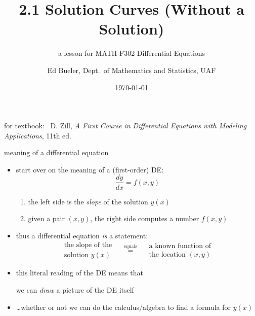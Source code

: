 \documentclass{beamer}
\title{2.1 Solution Curves (Without a Solution)}
\subtitle{a lesson for MATH F302 Differential Equations}
\author{Ed Bueler, Dept.~of Mathematics and Statistics, UAF}
\date{\tiny \today}
\begin{document}


\begin{frame}
\titlepage

\centerline{\tiny for textbook: \, D. Zill, \emph{A First Course in Differential Equations with Modeling Applications}, 11th ed.}
\end{frame}


\begin{frame}{meaning of a differential equation}

\begin{itemize}
\item start over on the meaning of a (first-order) DE:
    $$\frac{dy}{dx} = f(x,y)$$

\vspace{-2mm}
    \begin{enumerate}
    \item the left side is the \emph{slope} of the solution $y(x)$
    \item given a pair $(x,y)$, the right side computes a number $f(x,y)$
    \end{enumerate}
\item thus a differential equation \emph{is} a statement:
    $$\begin{matrix}
    \text{the slope of the} \\
    \text{solution } y(x) 
    \end{matrix} \quad \stackrel{\text{equals}}{=} \quad
    \begin{matrix}
    \text{a known function of} \\
    \text{the location } (x,y)
    \end{matrix}$$
\item this literal reading of the DE means that

\centerline{\alert{we can \emph{draw} a picture of the DE itself}}

\item \dots whether or not we can do the calculus/algebra to find a formula for $y(x)$
\end{itemize}
\end{frame}
\end{document}
